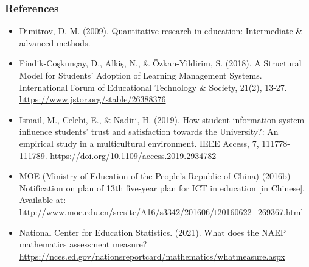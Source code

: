 \documentclass{beamer}
\begin{document}
\begin{frame}
  \frametitle{References}
  \begin{multicols}{2}
      \footnotesize{
      \begin{itemize}
          \item Dimitrov, D. M. (2009). Quantitative research in education: Intermediate \& advanced methods.
          \item Findik-Coşkunçay, D., Alkiş, N., \& Özkan-Yildirim, S. (2018). A Structural Model for Students' Adoption of Learning Management Systems. International Forum of Educational Technology \& Society, 21(2), 13-27. \url{https://www.jstor.org/stable/26388376}
          \item Ismail, M., Celebi, E., \& Nadiri, H. (2019). How student information system influence students’ trust and satisfaction towards the University?: An empirical study in a multicultural environment. IEEE Access, 7, 111778-111789. \url{https://doi.org/10.1109/access.2019.2934782}
          \item MOE (Ministry of Education of the People’s Republic of China) (2016b) Notification on plan of 13th five-year plan for ICT in education [in Chinese]. Available at: \url{http://www.moe.edu.cn/srcsite/A16/s3342/201606/t20160622_269367.html}
          \item National Center for Education Statistics. (2021). What does the NAEP mathematics assessment measure? \url{https://nces.ed.gov/nationsreportcard/mathematics/whatmeasure.aspx}
      \end{itemize}
      }
  \end{multicols}
\end{frame}
\end{document}
